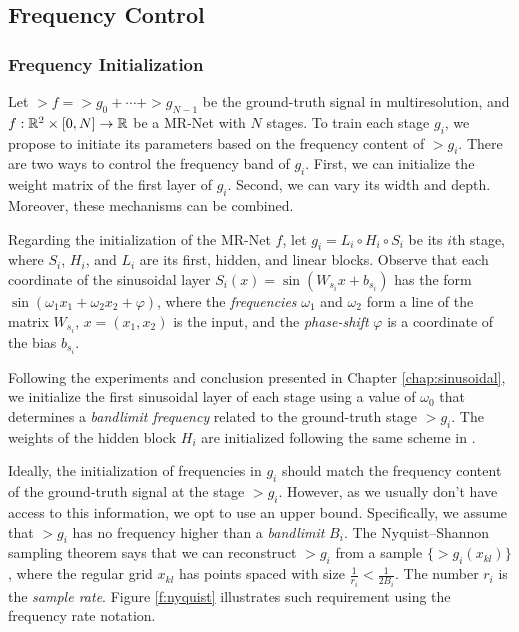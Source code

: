 \subsection{Frequency Control}
\label{s-frequency-control}


\subsubsection{Frequency Initialization}
\label{s-frequency-initialization}

Let $\gt{f}=\gt{g}_0+\cdots+\gt{g}_{N-1}$ be the ground-truth signal in multiresolution, and $f:\mathbb{R}^2\times [0,N]\to \mathbb{R}$ be a MR-Net with $N$ stages. To train each stage $g_i$, we propose to initiate its parameters based on the frequency content of $\gt{g}_i$.
There are two ways to control the frequency band of $g_i$. First, we can initialize the weight matrix of the first layer of $g_i$. Second, we can vary its width and depth. Moreover, these mechanisms can be combined.

Regarding the initialization of the MR-Net $f$, let $g_i=L_i\circ H_i\circ S_i$ be its $i$th stage, where $S_i$, $H_i$, and $L_i$ are its first, hidden, and linear blocks.
Observe that each coordinate of the sinusoidal layer $S_i(x)=\sin\left(W_{s_i} x+b_{s_i}\right)$ has the form $\sin(\omega_1 x_1 +\omega_2 x_2 + \varphi)$, where the \textit{frequencies} $\omega_1$ and $\omega_2$ form a line of the matrix $W_{s_i}$, $x=(x_1,x_2)$ is the input, and the \textit{phase-shift} $ \varphi$ is a coordinate of the bias $b_{s_i}$. 

Following the experiments and conclusion presented in Chapter \ref{chap:sinusoidal}, we initialize the first sinusoidal layer of each stage using a value of $\omega_0$ that determines a \textit{bandlimit frequency} related to the ground-truth stage $\gt{g}_i$. The weights of the hidden block $H_i$ are initialized following the same scheme in \cite{sitzmann2019siren}.

Ideally, the initialization of frequencies in $g_i$ should match the frequency content of the ground-truth signal at the stage $\gt{g}_i$. However, as we usually don't have access to this information, we opt to use an upper bound. Specifically, we assume that $\gt{g}_i$ has no frequency higher than a \textit{bandlimit} $B_i$. The Nyquist–Shannon sampling theorem says that we can reconstruct $\gt{g}_i$ from a sample $\{\gt{g}_i(x_{kl})\}$, where the regular grid $x_{kl}$ has points spaced with size $\frac{1}{r_i}<\frac{1}{2B_i}$. The number $r_i$ is the \textit{sample rate}. Figure \ref{f:nyquist} illustrates such requirement using the frequency rate notation.  

